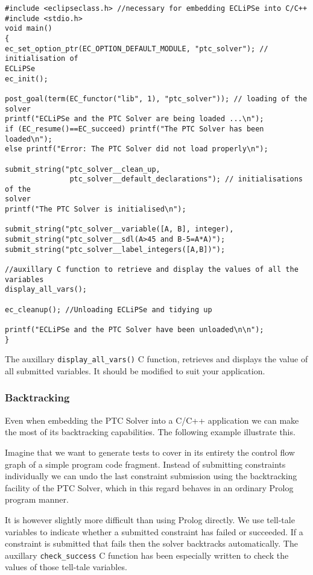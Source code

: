 \documentclass{article}
\begin{document}
\begin{verbatim}
#include <eclipseclass.h> //necessary for embedding ECLiPSe into C/C++
#include <stdio.h>
void main()
{
ec_set_option_ptr(EC_OPTION_DEFAULT_MODULE, "ptc_solver"); // initialisation of
ECLiPSe
ec_init();

post_goal(term(EC_functor("lib", 1), "ptc_solver")); // loading of the solver
printf("ECLiPSe and the PTC Solver are being loaded ...\n");
if (EC_resume()==EC_succeed) printf("The PTC Solver has been loaded\n");
else printf("Error: The PTC Solver did not load properly\n");

submit_string("ptc_solver__clean_up,
               ptc_solver__default_declarations"); // initialisations of the
solver
printf("The PTC Solver is initialised\n");

submit_string("ptc_solver__variable([A, B], integer),
submit_string("ptc_solver__sdl(A>45 and B-5=A*A)");
submit_string("ptc_solver__label_integers([A,B])");

//auxillary C function to retrieve and display the values of all the variables
display_all_vars();

ec_cleanup(); //Unloading ECLiPSe and tidying up

printf("ECLiPSe and the PTC Solver have been unloaded\n\n");
}
\end{verbatim}

The auxillary \verb+display_all_vars()+ C function, retrieves and displays the
value of
all submitted variables. It should be modified to suit your application.

\subsubsection{Backtracking}

Even when embedding the PTC Solver into a C/C++ application we can make the
most of its backtracking capabilities. The following example illustrate this.

Imagine that we want to generate tests to cover in its entirety the control flow
graph of a simple program code fragment. Instead of submitting constraints
individually we can undo the last constraint submission using the backtracking
facility of the PTC Solver, which in this regard behaves in an ordinary Prolog
program manner.

It is however slightly more difficult than using Prolog
directly. We use tell-tale variables to indicate whether a submitted constraint
has failed or succeeded. If a constraint is submitted that fails then the solver
backtracks automatically. The auxillary \verb+check_success+ C function has been
especially written to check the values of those tell-tale variables.
\end{document}
